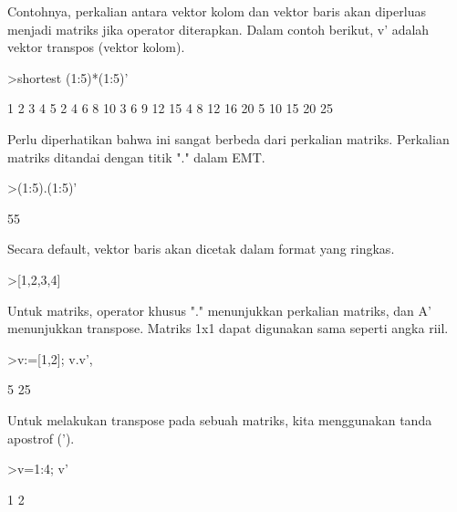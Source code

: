 \documentclass[12pt,arial,letterpaper]{book}
\begin{document}
\begin{eulercomment}
\begin{eulercomment}
\begin{eulercomment}
\begin{eulercomment}
\begin{eulercomment}
\begin{eulercomment}
\begin{eulercomment}
Contohnya, perkalian antara vektor kolom dan vektor baris akan
diperluas menjadi matriks jika operator diterapkan. Dalam contoh
berikut, v' adalah vektor transpos (vektor kolom).
\end{eulercomment}
\begin{eulerprompt}
>shortest (1:5)*(1:5)'
\end{eulerprompt}
\begin{euleroutput}
       1      2      3      4      5 
       2      4      6      8     10 
       3      6      9     12     15 
       4      8     12     16     20 
       5     10     15     20     25 
\end{euleroutput}
\begin{eulercomment}
Perlu diperhatikan bahwa ini sangat berbeda dari perkalian matriks.
Perkalian matriks ditandai dengan titik "." dalam EMT.
\end{eulercomment}
\begin{eulerprompt}
>(1:5).(1:5)'
\end{eulerprompt}
\begin{euleroutput}
  55
\end{euleroutput}
\begin{eulercomment}
Secara default, vektor baris akan dicetak dalam format yang ringkas.
\end{eulercomment}
\begin{eulerprompt}
>[1,2,3,4]
\end{eulerprompt}
\begin{euleroutput}
  [1,  2,  3,  4]
\end{euleroutput}
\begin{eulercomment}
Untuk matriks, operator khusus "." menunjukkan perkalian matriks, dan
A' menunjukkan transpose. Matriks 1x1 dapat digunakan sama seperti
angka riil.
\end{eulercomment}
\begin{eulerprompt}
>v:=[1,2]; v.v', %
\end{eulerprompt}
\begin{euleroutput}
  5
  25
\end{euleroutput}
\begin{eulercomment}
Untuk melakukan transpose pada sebuah matriks, kita menggunakan tanda
apostrof (').
\end{eulercomment}
\begin{eulerprompt}
>v=1:4; v'
\end{eulerprompt}
\begin{euleroutput}
              1 
              2 

\end{euleroutput}
\end{eulercomment}
\end{eulercomment}
\end{eulercomment}
\end{eulercomment}
\end{eulercomment}
\end{eulercomment}
\end{document}

